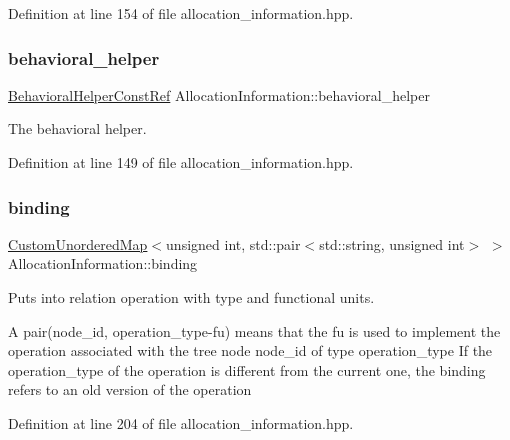 Definition at line 154 of file allocation\+\_\+information.\+hpp.

\mbox{\label{classAllocationInformation_ab357c71a89bef077a55c088e8c5ae710}} 
\subsubsection{\texorpdfstring{behavioral\+\_\+helper}{behavioral\_helper}}
{\footnotesize\ttfamily \hyperlink{behavioral__helper_8hpp_aae973b54cac87eef3b27442aa3e1e425}{Behavioral\+Helper\+Const\+Ref} Allocation\+Information\+::behavioral\+\_\+helper\hspace{0.3cm}{\ttfamily [private]}}



The behavioral helper. 



Definition at line 149 of file allocation\+\_\+information.\+hpp.

\mbox{\label{classAllocationInformation_af42e9cc6ab7f4d1c743d52e59177e480}} 
\subsubsection{\texorpdfstring{binding}{binding}}
{\footnotesize\ttfamily \hyperlink{custom__map_8hpp_ad1ed68f2ff093683ab1a33522b144adc}{Custom\+Unordered\+Map}$<$unsigned int, std\+::pair$<$std\+::string, unsigned int$>$ $>$ Allocation\+Information\+::binding\hspace{0.3cm}{\ttfamily [private]}}



Puts into relation operation with type and functional units. 

A pair(node\+\_\+id, operation\+\_\+type-\/fu) means that the fu is used to implement the operation associated with the tree node node\+\_\+id of type operation\+\_\+type If the operation\+\_\+type of the operation is different from the current one, the binding refers to an old version of the operation 

Definition at line 204 of file allocation\+\_\+information.\+hpp.



